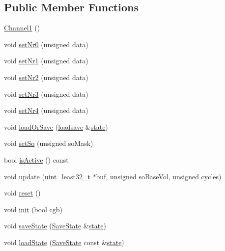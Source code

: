 \subsection*{Public Member Functions}
\begin{DoxyCompactItemize}
\item 
\hyperlink{classgambatte_1_1Channel1_af9772f188a3ea499d5ba9d39dbea0545}{Channel1} ()
\item 
void \hyperlink{classgambatte_1_1Channel1_a35804a47c4fdc016ee1b320a504ead57}{set\+Nr0} (unsigned data)
\item 
void \hyperlink{classgambatte_1_1Channel1_ad6f37baaf93cfb198fadec94458ba0eb}{set\+Nr1} (unsigned data)
\item 
void \hyperlink{classgambatte_1_1Channel1_a13d4da832148c21ab5c5089ea89de04f}{set\+Nr2} (unsigned data)
\item 
void \hyperlink{classgambatte_1_1Channel1_aaaef9bf0929047b22e021b100c74667c}{set\+Nr3} (unsigned data)
\item 
void \hyperlink{classgambatte_1_1Channel1_af833ad0df03d687fd907803adeff9280}{set\+Nr4} (unsigned data)
\item 
void \hyperlink{classgambatte_1_1Channel1_ad5868a2f2444ee8275cae4e6f3f9099a}{load\+Or\+Save} (\hyperlink{classgambatte_1_1loadsave}{loadsave} \&\hyperlink{ppu_8cpp_a2f2eca6997ee7baf8901725ae074d45b}{state})
\item 
void \hyperlink{classgambatte_1_1Channel1_a14c458e2f7a0816c658ff9b4453f28a3}{set\+So} (unsigned so\+Mask)
\item 
bool \hyperlink{classgambatte_1_1Channel1_aa40be7480b84da826cc6ec4eec9a4cf8}{is\+Active} () const
\item 
void \hyperlink{classgambatte_1_1Channel1_afaf4543d2bb197c441366e68feac1112}{update} (\hyperlink{namespacegambatte_a0639f09fccfbbd5a8e0796318768e370}{uint\+\_\+least32\+\_\+t} $\ast$\hyperlink{ioapi_8h_a8ad8a13c88886b9f623034ff88570adb}{buf}, unsigned so\+Base\+Vol, unsigned cycles)
\item 
void \hyperlink{classgambatte_1_1Channel1_a734c2e319d5cf2baaee9e23064c55b1b}{reset} ()
\item 
void \hyperlink{classgambatte_1_1Channel1_a91245cfe66613f5243b55cee311564cf}{init} (bool cgb)
\item 
void \hyperlink{classgambatte_1_1Channel1_ac7b4065f024987d29a090fd53771428d}{save\+State} (\hyperlink{structgambatte_1_1SaveState}{Save\+State} \&\hyperlink{ppu_8cpp_a2f2eca6997ee7baf8901725ae074d45b}{state})
\item 
void \hyperlink{classgambatte_1_1Channel1_a156844c5b54cf3cd6ba348064e3b0127}{load\+State} (\hyperlink{structgambatte_1_1SaveState}{Save\+State} const \&\hyperlink{ppu_8cpp_a2f2eca6997ee7baf8901725ae074d45b}{state})
\end{DoxyCompactItemize}
